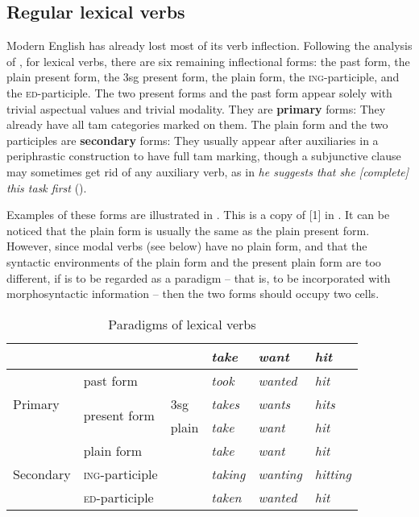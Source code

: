 \documentclass[UTF8, a4paper, oneside, scheme=plain, 12pt]{ctexbook}
\newcommand*{\citesec}[1]{\S~{#1}}
\newcommand*{\citechap}[1]{Ch~{#1}}
\newcommand*{\citechapsec}[2]{\citechap{#1}.\citesec{#2}}
\newcommand*{\concept}[1]{\textbf{#1}}
\newcommand{\form}[1]{\emph{#1}}
\newcommand{\formcat}[1]{\textsc{#1}}
\begin{document}
\subsection{Regular lexical verbs}\label{sec:verb-forms}

Modern English has already lost most of its verb inflection.
Following the analysis of \citet[\citechapsec{3}{1.1}]{cgel},
for lexical verbs,
there are six remaining inflectional forms: 
the past form, the plain present form, 
the 3sg present form,
the plain form, the \formcat{ing}-participle,
and the \formcat{ed}-participle.
The two present forms and the past form appear solely 
with trivial aspectual values and trivial modality.
They are \concept{primary} forms:
They already have all \acs{tam} categories marked on them.
The plain form and the two participles are \concept{secondary} forms:
They usually appear after auxiliaries 
in a periphrastic construction to have full \acs{tam} marking,
though a subjunctive clause may sometimes get rid of any auxiliary verb,
as in \form{he suggests that she [complete] this task first} ().

Examples of these forms are illustrated in . 
This is a copy of [1] in \citet[\citesec{1.1}]{cgel}.
It can be noticed that the plain form is usually the same as the plain present form.
However, since modal verbs (see below) have no plain form,
and that the syntactic environments of the plain form and the present plain form are too different,
if  is to be regarded as a paradigm
-- that is, to be incorporated with morphosyntactic information -- 
then the two forms should occupy two cells.

\begin{table}[H]
    \caption{Paradigms of lexical verbs}
    \label{tbl:lexical-inflection}
    \centering
    \begin{tabular}{@{}llllll@{}}
    \toprule
    \multicolumn{1}{l}{}       &                               &       & \form{take}   & \form{want}    & \form{hit}     \\ \midrule
    \multirow{3}{*}{Primary}   & past form                     &       & \form{took}   & \form{wanted}  & \form{hit}     \\
                               & \multirow{2}{*}{present form} & 3sg   & \form{takes}  & \form{wants}   & \form{hits}    \\
                               &                               & plain & \form{take}   & \form{want}    & \form{hit}     \\ \midrule
    \multirow{3}{*}{Secondary} & plain form                    &       & \form{take}   & \form{want}    & \form{hit}     \\
                               & \formcat{ing}-participle       &       & \form{taking} & \form{wanting} & \form{hitting} \\
                               & \formcat{ed}-participle        &       & \form{taken}  & \form{wanted}  & \form{hit}     \\ \bottomrule
    \end{tabular}
\end{table}
\end{document}
